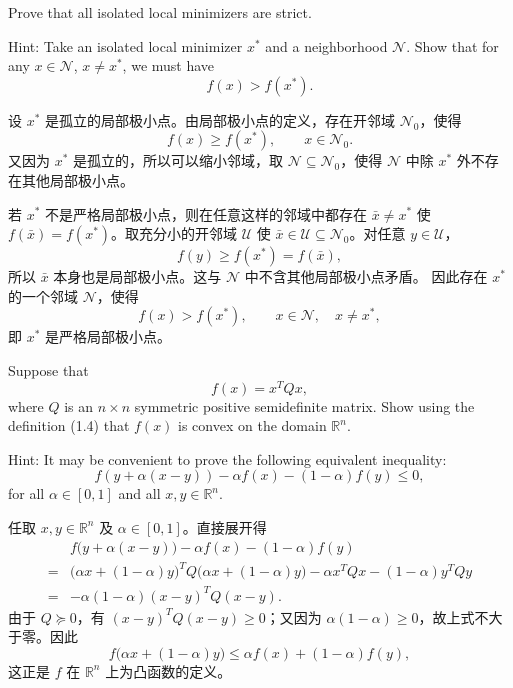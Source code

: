 \documentclass{ctexart}
\begin{document}
\begin{problem}[2.6]
Prove that all isolated local minimizers are strict.

Hint: Take an isolated local minimizer $x^*$ and a neighborhood $\mathcal{N}$.
Show that for any $x\in\mathcal{N}$, $x\neq x^*$, we must have
\[
    f(x)>f(x^*).
\]
\end{problem}

\begin{solution}
设 $x^*$ 是孤立的局部极小点。由局部极小点的定义，存在开邻域
$\mathcal N_0$，使得
\[
    f(x)\geq f(x^*),\qquad x\in\mathcal N_0.
\]
又因为 $x^*$ 是孤立的，所以可以缩小邻域，取
$\mathcal N\subseteq\mathcal N_0$，使得 $\mathcal N$ 中除 $x^*$ 外不存在其他局部极小点。

若 $x^*$ 不是严格局部极小点，则在任意这样的邻域中都存在
$\bar x\neq x^*$ 使 $f(\bar x)=f(x^*)$。取充分小的开邻域
$\mathcal U$ 使 $\bar x\in\mathcal U\subseteq\mathcal N_0$。对任意 $y\in\mathcal U$，
\[
    f(y)\geq f(x^*)=f(\bar x),
\]
所以 $\bar x$ 本身也是局部极小点。这与 $\mathcal N$ 中不含其他局部极小点矛盾。
因此存在 $x^*$ 的一个邻域 $\mathcal N$，使得
\[
    f(x)>f(x^*),\qquad x\in\mathcal N,\quad x\neq x^*,
\]
即 $x^*$ 是严格局部极小点。
\end{solution}

\begin{problem}[2.7]
Suppose that
\[
    f(x)=x^TQx,
\]
where $Q$ is an $n\times n$ symmetric positive semidefinite matrix.
Show using the definition (1.4) that $f(x)$ is convex on the domain $\mathbb{R}^n$.

Hint: It may be convenient to prove the following equivalent inequality:
\[
    f(y+\alpha(x-y))
    -\alpha f(x)
    -(1-\alpha)f(y)
    \leq 0,
\]
for all $\alpha\in[0,1]$ and all $x,y\in\mathbb{R}^n$.
\end{problem}

\begin{solution}
任取 $x,y\in\mathbb R^n$ 及 $\alpha\in[0,1]$。直接展开得
\begin{align*}
&f\bigl(y+\alpha(x-y)\bigr)-\alpha f(x)-(1-\alpha)f(y)\\
={}&\bigl(\alpha x+(1-\alpha)y\bigr)^TQ
       \bigl(\alpha x+(1-\alpha)y\bigr)
       -\alpha x^TQx-(1-\alpha)y^TQy\\
={}&-\alpha(1-\alpha)(x-y)^TQ(x-y).
\end{align*}
由于 $Q\succeq0$，有 $(x-y)^TQ(x-y)\geq0$；又因为
$\alpha(1-\alpha)\geq0$，故上式不大于零。因此
\[
    f\bigl(\alpha x+(1-\alpha)y\bigr)
    \leq \alpha f(x)+(1-\alpha)f(y),
\]
这正是 $f$ 在 $\mathbb R^n$ 上为凸函数的定义。
\end{solution}
\end{document}
